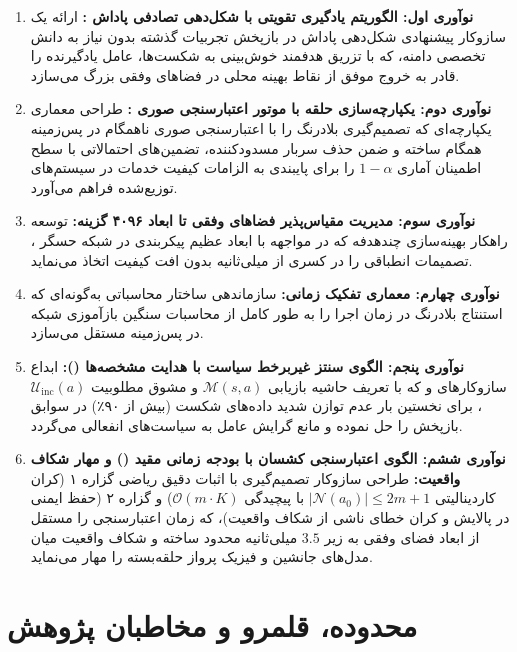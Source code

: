 \documentclass[oneside,openany,phd]{TMU-Thesis}
\begin{document}
\begin{enumerate}
  \item \textbf{نوآوری اول: الگوریتم یادگیری تقویتی با شکل‌دهی تصادفی پاداش :} 
  ارائه یک سازوکار پیشنهادی شکل‌دهی پاداش در بازپخش تجربیات گذشته بدون نیاز به دانش تخصصی دامنه، که با تزریق هدفمند خوش‌بینی به شکست‌ها، عامل یادگیرنده را قادر به خروج موفق از نقاط بهینه محلی در فضاهای وفقی بزرگ می‌سازد.
  
  \item \textbf{نوآوری دوم: یکپارچه‌سازی حلقه  با موتور اعتبارسنجی صوری :} 
  طراحی معماری یکپارچه‌ای که تصمیم‌گیری بلادرنگ را با اعتبارسنجی صوری ناهمگام در پس‌زمینه همگام ساخته و ضمن حذف سربار مسدودکننده، تضمین‌های احتمالاتی با سطح اطمینان آماری $1-\alpha$ را برای پایبندی به الزامات کیفیت خدمات در سیستم‌های توزیع‌شده فراهم می‌آورد.
  
  \item \textbf{نوآوری سوم: مدیریت مقیاس‌پذیر فضاهای وفقی تا ابعاد ۴۰۹۶ گزینه:} 
  توسعه راهکار بهینه‌سازی چندهدفه که در مواجهه با ابعاد عظیم پیکربندی در شبکه حسگر ، تصمیمات انطباقی را در کسری از میلی‌ثانیه بدون افت کیفیت اتخاذ می‌نماید.

  \item \textbf{نوآوری چهارم: معماری تفکیک زمانی:}
  سازماندهی ساختار محاسباتی به‌گونه‌ای که استنتاج بلادرنگ در زمان اجرا را به طور کامل از محاسبات سنگین بازآموزی شبکه در پس‌زمینه مستقل می‌سازد.

  \item \textbf{نوآوری پنجم: الگوی سنتز غیربرخط سیاست با هدایت مشخصه‌ها (\sgos):}
  ابداع سازوکارهای \mursdrl و \cmrsdrl که با تعریف حاشیه بازیابی $\mathcal{M}(s, a)$ و مشوق مطلوبیت $\mathcal{U}_{\text{inc}}(a)$، برای نخستین بار عدم توازن شدید داده‌های شکست (بیش از ۹۰٪) در سوابق بازپخش را حل نموده و مانع گرایش عامل به سیاست‌های انفعالی می‌گردد.

  \item \textbf{نوآوری ششم: الگوی اعتبارسنجی کشسان با بودجه زمانی مقید (\caepv) و مهار شکاف واقعیت:}
  طراحی سازوکار تصمیم‌گیری \pgalr با اثبات دقیق ریاضی گزاره ۱ (کران کاردینالیتی $|\mathcal{N}(a_0)| \le 2m + 1$ با پیچیدگی $\mathcal{O}(m \cdot K)$) و گزاره ۲ (حفظ ایمنی در پالایش و کران خطای ناشی از شکاف واقعیت)، که زمان اعتبارسنجی را مستقل از ابعاد فضای وفقی به زیر $3.5$ میلی‌ثانیه محدود ساخته و شکاف واقعیت میان مدل‌های جانشین و فیزیک پرواز حلقه‌بسته را مهار می‌نماید.
\end{enumerate}

\section*{محدوده، قلمرو و مخاطبان پژوهش}
\end{document}
